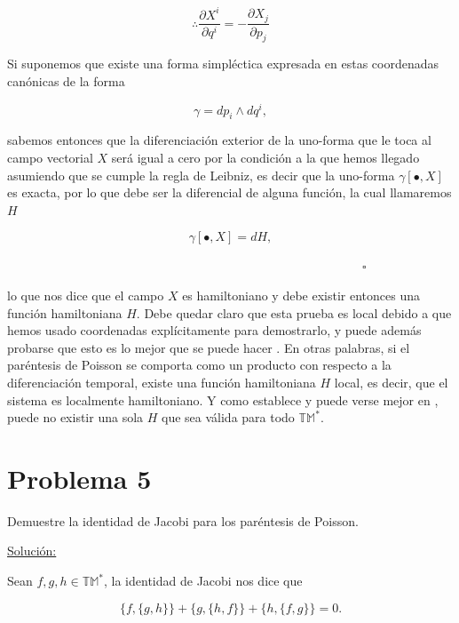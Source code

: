 \documentclass[a4paper,10pt]{article}
\numberwithin{equation}{section}
\begin{document}
\begin{equation}
 \therefore \frac{\partial X^i}{\partial q^i} = - \frac{\partial X_j}{\partial p_j}
\end{equation}

Si suponemos que existe una forma simpléctica expresada en estas coordenadas canónicas 
de la forma

\begin{equation}
 \gamma = dp_i \wedge dq^i,
\end{equation}

sabemos entonces que la diferenciación exterior de la uno-forma que le toca 
al campo vectorial $X$ será igual a cero por la condición a la que hemos llegado
asumiendo que se cumple la regla de Leibniz, es decir que la uno-forma $\gamma[\bullet,X]$
es exacta, por lo que debe ser la diferencial de alguna función, la cual llamaremos 
$H$ 

\begin{equation}
\gamma[\bullet,X] = dH,
\end{equation}

$\hspace{12cm} \square$

lo que nos dice que el campo $X$ es hamiltoniano y debe existir entonces una función 
hamiltoniana $H$. Debe quedar claro que esta prueba es local debido a que hemos usado coordenadas 
explícitamente para demostrarlo, y puede además probarse que esto es lo mejor que 
se puede hacer \cite{saletan}. En otras palabras, si el paréntesis de Poisson se comporta como un 
producto con respecto a la diferenciación temporal, existe una función hamiltoniana $H$ 
local, es decir, que el sistema es localmente hamiltoniano. Y como establece \cite{saletan}
y puede verse mejor en \cite{abraham}, puede no existir una sola $H$ que sea válida para 
todo $\mathbb{TM^*}$.

\section{Problema 5}

Demuestre la identidad de Jacobi para los paréntesis de Poisson.

\vspace{.3cm}

\underline{Solución:} \vspace{.3cm}

Sean $f,g,h \in \mathbb{TM}^*$, la identidad de Jacobi nos dice que 

\begin{equation}
 \{f,\{g,h\}\} + \{g,\{h,f\}\} + \{h,\{f,g\}\} = 0.
\end{equation}
\end{document}
